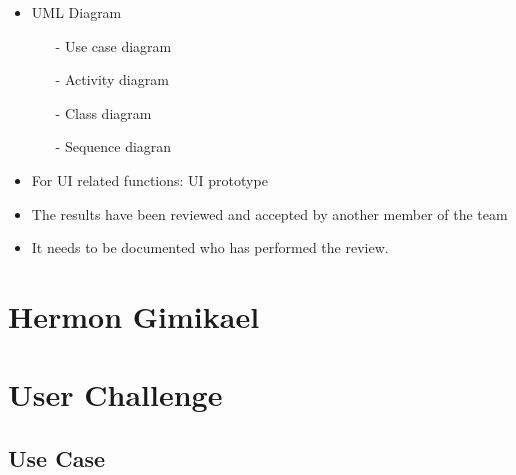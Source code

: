 \documentclass{article}
\begin{document}
\begin{itemize}
\item
  UML Diagram
  \begin{itemize}
	\item[-] Use case diagram
	\item[-] Activity diagram
	\item[-] Class diagram
	\item[-] Sequence diagran
   \end{itemize}
\end{itemize}

\begin{itemize}
\item
  For UI related functions: UI prototype
\item
  The results have been reviewed and accepted by another member of the
  team
\end{itemize}

\begin{itemize}
\item
  It needs to be documented who has performed the review.
\end{itemize}
\newpage

\section{Hermon Gimikael}
\section{User Challenge}
\subsection{Use Case}
\end{document}
